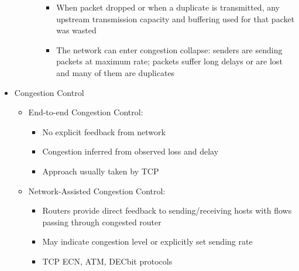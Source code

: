 \begin{itemize}
\begin{itemize}
\begin{itemize}
\begin{itemize}
              \item When packet dropped or when a duplicate is transmitted, any upstream transmission capacity and buffering used for that packet was wasted

              \item The network can enter congestion collapse: senders are sending packets at maximum rate; packets suffer long delays or are lost and many of them are duplicates

            \end{itemize}

        \end{itemize}

    \end{itemize}

  \item Congestion Control

    \begin{itemize}

      \item End-to-end Congestion Control:

        \begin{itemize}

          \item No explicit feedback from network

          \item Congestion inferred from observed loss and delay

          \item Approach usually taken by TCP

        \end{itemize}

      \item Network-Assisted Congestion Control:

        \begin{itemize}

          \item Routers provide direct feedback to sending/receiving hosts with flows passing through congested router

          \item May indicate congestion level or explicitly set sending rate

          \item TCP ECN, ATM, DECbit protocols

        \end{itemize}

    \end{itemize}


\end{itemize}
